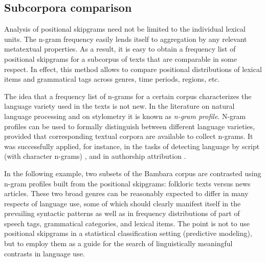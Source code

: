 \documentclass[12pt]{article}
\begin{document}
\subsection{Subcorpora comparison}


Analysis of positional skipgrams need not be limited to the individual
lexical units. The n-gram frequency easily lends itself to aggregation
by any relevant metatextual properties. As a result, it is easy to
obtain a frequency list of positional skipgrams for a subcorpus of
texts that are comparable in some respect. In effect, this method
allows to compare positional distributions of lexical items and
grammatical tags across genres, time periods, regions, etc.

The idea that a frequency list of n-grams for a certain corpus
characterizes the language variety used in the texts is not new. In
the literature on natural language processing and on stylometry it is
known as \textit{n-gram profile}. N-gram profiles can be used to
formally distinguish between different language varieties, provided
that corresponding textual corpora are available to collect n-grams.
It was successfully applied, for instance, in the tasks of detecting
language by script (with character n-grams) \autocite{cavnar1994n}, and
in authorship attribution \autocite{koppel2003exploiting}.

In the following example, two subsets of the Bambara corpus are
contrasted using n-gram profiles built from the positional skipgrams:
folkloric texts versus news articles. These two broad genres can be
reasonably expected to differ in many respects of language use, some
of which should clearly manifest itself in the prevailing syntactic
patterns as well as in frequency distributions of part of speech tags,
grammatical categories, and lexical items. The point is not to use
positional skipgrams in a statistical classification setting
(predictive modeling), but to employ them as a guide for the search of
linguistically meaningful contrasts in language use.
\end{document}

